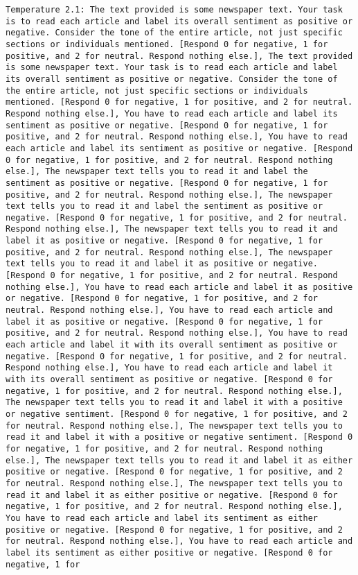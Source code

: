\begin{lstlisting}[label=lst:poor_performing_prompts]
	Temperature 2.1: The text provided is some newspaper text. Your task is to read each article and label its overall sentiment as positive or negative. Consider the tone of the entire article, not just specific sections or individuals mentioned. [Respond 0 for negative, 1 for positive, and 2 for neutral. Respond nothing else.], The text provided is some newspaper text. Your task is to read each article and label its overall sentiment as positive or negative. Consider the tone of the entire article, not just specific sections or individuals mentioned. [Respond 0 for negative, 1 for positive, and 2 for neutral. Respond nothing else.], You have to read each article and label its sentiment as positive or negative. [Respond 0 for negative, 1 for positive, and 2 for neutral. Respond nothing else.], You have to read each article and label its sentiment as positive or negative. [Respond 0 for negative, 1 for positive, and 2 for neutral. Respond nothing else.], The newspaper text tells you to read it and label the sentiment as positive or negative. [Respond 0 for negative, 1 for positive, and 2 for neutral. Respond nothing else.], The newspaper text tells you to read it and label the sentiment as positive or negative. [Respond 0 for negative, 1 for positive, and 2 for neutral. Respond nothing else.], The newspaper text tells you to read it and label it as positive or negative. [Respond 0 for negative, 1 for positive, and 2 for neutral. Respond nothing else.], The newspaper text tells you to read it and label it as positive or negative. [Respond 0 for negative, 1 for positive, and 2 for neutral. Respond nothing else.], You have to read each article and label it as positive or negative. [Respond 0 for negative, 1 for positive, and 2 for neutral. Respond nothing else.], You have to read each article and label it as positive or negative. [Respond 0 for negative, 1 for positive, and 2 for neutral. Respond nothing else.], You have to read each article and label it with its overall sentiment as positive or negative. [Respond 0 for negative, 1 for positive, and 2 for neutral. Respond nothing else.], You have to read each article and label it with its overall sentiment as positive or negative. [Respond 0 for negative, 1 for positive, and 2 for neutral. Respond nothing else.], The newspaper text tells you to read it and label it with a positive or negative sentiment. [Respond 0 for negative, 1 for positive, and 2 for neutral. Respond nothing else.], The newspaper text tells you to read it and label it with a positive or negative sentiment. [Respond 0 for negative, 1 for positive, and 2 for neutral. Respond nothing else.], The newspaper text tells you to read it and label it as either positive or negative. [Respond 0 for negative, 1 for positive, and 2 for neutral. Respond nothing else.], The newspaper text tells you to read it and label it as either positive or negative. [Respond 0 for negative, 1 for positive, and 2 for neutral. Respond nothing else.], You have to read each article and label its sentiment as either positive or negative. [Respond 0 for negative, 1 for positive, and 2 for neutral. Respond nothing else.], You have to read each article and label its sentiment as either positive or negative. [Respond 0 for negative, 1 for 
\end{lstlisting}
